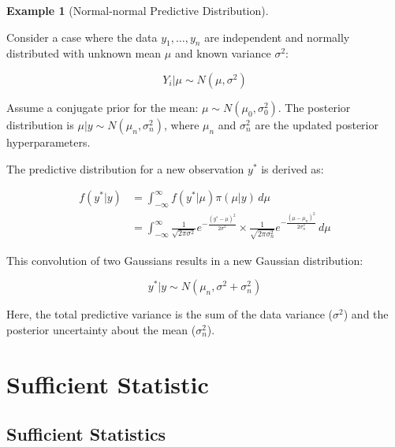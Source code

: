 \documentclass[
  letterpaper,
  DIV=11,
  numbers=noendperiod]{scrreprt}
\renewcommand{\[}{\begin{equation}}
\renewcommand{\]}{\end{equation}}
\theoremstyle{definition}
\theoremstyle{plain}
\theoremstyle{plain}
\theoremstyle{plain}
\theoremstyle{definition}
\newtheorem{example}{Example}[chapter]
\theoremstyle{plain}
\theoremstyle{remark}
\begin{document}
\begin{example}[Normal-normal Predictive
Distribution]\protect\hypertarget{exm-predictive-normal}{}\label{exm-predictive-normal}

Consider a case where the data \(y_1, \dots, y_n\) are independent and
normally distributed with unknown mean \(\mu\) and known variance
\(\sigma^2\):

\[
Y_i | \mu \sim N(\mu, \sigma^2)
\]

Assume a conjugate prior for the mean:
\(\mu \sim N(\mu_0, \sigma_0^2)\). The posterior distribution is
\(\mu|y \sim N(\mu_n, \sigma_n^2)\), where \(\mu_n\) and \(\sigma_n^2\)
are the updated posterior hyperparameters.

The predictive distribution for a new observation \(y^*\) is derived as:

\[
\begin{aligned}
f(y^*|y) &= \int_{-\infty}^{\infty} f(y^*|\mu) \pi(\mu|y) \, d\mu \\
&= \int_{-\infty}^{\infty} \frac{1}{\sqrt{2\pi\sigma^2}} e^{-\frac{(y^*-\mu)^2}{2\sigma^2}} \times \frac{1}{\sqrt{2\pi\sigma_n^2}} e^{-\frac{(\mu-\mu_n)^2}{2\sigma_n^2}} \, d\mu
\end{aligned}
\]

This convolution of two Gaussians results in a new Gaussian
distribution:

\[
y^* | y \sim N(\mu_n, \sigma^2 + \sigma_n^2)
\]

Here, the total predictive variance is the sum of the data variance
(\(\sigma^2\)) and the posterior uncertainty about the mean
(\(\sigma_n^2\)).

\end{example}


\chapter{Sufficient Statistic}\label{sufficient-statistic}

\section{Sufficient Statistics}\label{sufficient-statistics}
\end{document}
